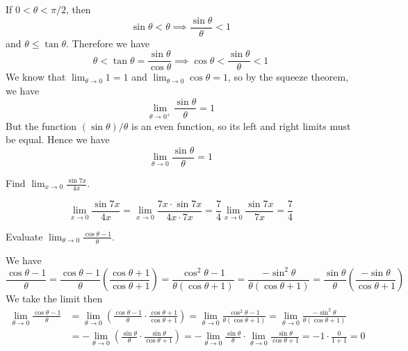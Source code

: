 If \(0<\theta<\pi/2\),
then \[\sin\theta<\theta\implies\frac{\sin\theta}{\theta}<1\]
and \(\theta\leq\tan\theta\).
Therefore we have
\[\theta<\tan\theta=\frac{\sin\theta}{\cos\theta}
\implies\cos\theta<\frac{\sin\theta}{\theta}<1\]
We know that \(\displaystyle{\lim_{\theta\to 0}1=1}\) and
\(\displaystyle{\lim_{\theta\to 0}\cos\theta=1}\),
so by the squeeze theorem,
we have
\[\lim_{\theta\to 0^+}\frac{\sin\theta}{\theta}=1\]
But the function \((\sin\theta)/\theta\) is an even function,
so its left and right limits must be equal.
Hence we have
\[\lim_{\theta\to 0}\frac{\sin\theta}{\theta}=1\]
\begin{problem}
    Find \(\displaystyle{\lim_{x\to 0}\frac{\sin 7x}{4x}}\).
\end{problem}
\begin{solution}
    \[\lim_{x\to 0}\frac{\sin 7x}{4x}
    =\lim_{x\to 0}\frac{7x\cdot\sin 7x}{4x\cdot7x}
    =\frac{7}{4}\lim_{x\to 0}\frac{\sin 7x}{7x}=\frac{7}{4}\]
\end{solution}
\begin{problem}
    Evaluate \(\displaystyle{\lim_{\theta\to 0}\frac{\cos\theta-1}{\theta}}\).
\end{problem}
\begin{solution}
    We have
    \[\frac{\cos\theta-1}{\theta}
    =\frac{\cos\theta-1}{\theta}\left(\frac{\cos\theta+1}{\cos\theta+1}\right)
    =\frac{\cos^2\theta-1}{\theta(\cos\theta+1)}
    =\frac{-\sin^2\theta}{\theta(\cos\theta+1)}
    =\frac{\sin\theta}{\theta}\left(\frac{-\sin\theta}{\cos\theta+1}\right)\]
    We take the limit then
    \begin{align*}
        \lim_{\theta\to 0}\frac{\cos\theta-1}{\theta}
        &= \lim_{\theta\to 0}\left(\frac{\cos\theta-1}{\theta}
        \cdot\frac{\cos\theta+1}{\cos\theta+1}\right)
        = \lim_{\theta\to 0}\frac{\cos^2\theta-1}{\theta(\cos\theta+1)}
        = \lim_{\theta\to 0}\frac{-\sin^2\theta}{\theta(\cos\theta+1)} \\
        &= -\lim_{\theta\to 0}\left(\frac{\sin\theta}{\theta}
        \cdot\frac{\sin\theta}{\cos\theta+1}\right)
        =-\lim_{\theta\to 0}\frac{\sin\theta}{\theta}
        \cdot\lim_{\theta\to 0}\frac{\sin\theta}{\cos\theta+1}
        = -1\cdot\frac{0}{1+1}=0
    \end{align*}
\end{solution}